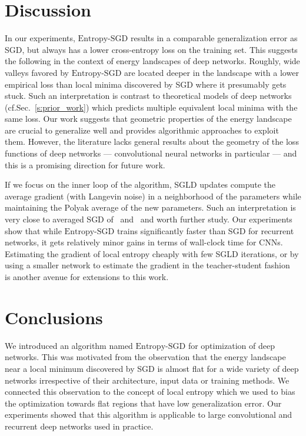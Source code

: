 \documentclass[10pt]{article}
\newcommand{\entropysgd}{\mathrm{Entropy}\textrm{-}\mathrm{SGD}}
\begin{document}
\section{Discussion}
\label{s:discussion}

In our experiments, $\entropysgd$ results in a comparable generalization error as SGD, but always has a lower cross-entropy loss on the training set. This suggests the following in the context of energy landscapes of deep networks. Roughly, wide valleys favored by $\entropysgd$ are located deeper in the landscape with a lower empirical loss than local minima discovered by SGD where it presumably gets stuck. Such an interpretation is contrast to theoretical models of deep networks (cf.\@ Sec.~\ref{s:prior_work}) which predicts multiple equivalent local minima with the same loss. Our work suggests that geometric properties of the energy landscape are crucial to generalize well and provides algorithmic approaches to exploit them. However, the literature lacks general results about the geometry of the loss functions of deep networks --- convolutional neural networks in particular --- and this is a promising direction for future work.

If we focus on the inner loop of the algorithm, SGLD updates compute the average gradient (with Langevin noise) in a neighborhood of the parameters while maintaining the Polyak average of the new parameters. Such an interpretation is very close to averaged SGD of~\citet{polyak1992acceleration} and~\citet{bottou2012stochastic} and worth further study. Our experiments show that while $\entropysgd$ trains significantly faster than SGD for recurrent networks, it gets relatively minor gains in terms of wall-clock time for CNNs. Estimating the gradient of local entropy cheaply with few SGLD iterations, or by using a smaller network to estimate the gradient in the teacher-student fashion~\citep{balan2015bayesian} is another avenue for extensions to this work.

\section{Conclusions}
\label{s:conclusions}

We introduced an algorithm named $\entropysgd$ for optimization of deep networks. This was motivated from the observation that the energy landscape near a local minimum discovered by SGD is almost flat for a wide variety of deep networks irrespective of their architecture, input data or training methods. We connected this observation to the concept of local entropy which we used to bias the optimization towards flat regions that have low generalization error. Our experiments showed that this algorithm is applicable to large convolutional and recurrent deep networks used in practice.
\end{document}
